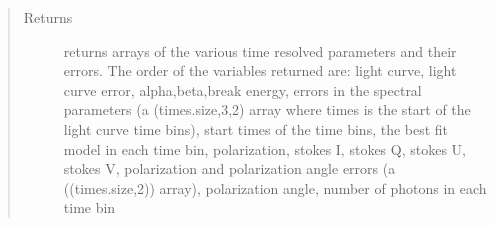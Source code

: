 \documentclass[letterpaper,10pt,english]{sphinxmanual}
\begin{document}
\begin{fulllineitems}
\begin{quote}
\begin{description}
\begin{itemize}
\end{itemize}

\item[{Returns}] \leavevmode
returns arrays of the various time resolved parameters and their errors. The order of the variables
returned are: light curve, light curve error, alpha,beta,break energy, errors in the spectral parameters
(a (times.size,3,2) array where times is the start of the light curve time bins), start times of the time bins, the best fit model in each time bin,
polarization, stokes I, stokes Q, stokes U, stokes V, polarization and polarization angle errors (a ((times.size,2)) array), polarization angle,
number of photons in each time bin

\end{description}\end{quote}

\end{fulllineitems}

\end{document}
